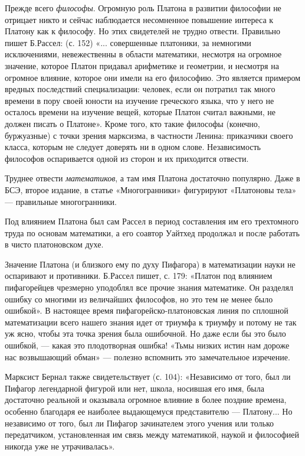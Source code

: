 Прежде  всего  \textit{философы}.  Огромную роль  Платона  в  развитии
философии  не   отрицает  никто   и  сейчас   наблюдается  несомненное
повышение  интереса  к Платону  как  к  философу. Но  этих  свидетелей
не   трудно  отвести.   Правильно  пишет   Б.Рассел:  (с.   152)  «...
совершенные  платоники,  за  немногими исключениями,  невежественны  в
области  математики, несмотря  на  огромное  значение, которое  Платон
придавал  арифметике  и геометрии,  и  несмотря  на огромное  влияние,
которое  они имели  на его  философию. Это  является примером  вредных
последствий специализации: человек, если он потратил так много времени
в  пору своей  юности  на изучение  греческого языка,  что  у него  не
осталось времени на изучение вещей,  которые Платон считал важными, не
должен писать  о Платоне».  Кроме того,  кто такие  философы (конечно,
буржуазные) с  точки зрения марксизма, в  частности Ленина: приказчики
своего  класса,  которым  не  следует   доверять  ни  в  одном  слове.
Независимость философов  оспаривается одной из сторон  и их приходится
отвести.

Труднее  отвести \textit{математиков},  а там  имя Платона  достаточно
популярно.  Даже  в  БСЭ,  второе издание,  в  статье  «Многогранники»
фигурируют «Платоновы тела» --- правильные многогранники.

Под  влиянием Платона  был  сам  Рассел в  период  составления им  его
трехтомного  труда  по  основам  математики,  а  его  соавтор  Уайтхед
продолжал и после работать в чисто платоновском духе.

Значение Платона  (и близкого  ему по  духу Пифагора)  в математизации
науки   не  оспаривают   и   противники.  Б.Рассел   пишет,  с.   179:
«Платон  под  влиянием  пифагорейцев чрезмерно  уподоблял  все  прочие
знания  математике.  Он  разделял  ошибку  со  многими  из  величайших
философов,  но это  тем  не  менее было  ошибкой».  В настоящее  время
пифагорейско-платоновская линия по сплошной математизации всего нашего
знания идет от  триумфа к триумфу и  потому не так уж  ясно, чтобы эта
точка зрения  была ошибочной. Но  даже если  бы это было  ошибкой, ---
какая  это плодотворная  ошибка!  «Тьмы низких  истин  нам дороже  нас
возвышающий обман» --- полезно вспомнить это замечательное изречение.

Марксист Бернал  также свидетельствует (с. 104):  «Независимо от того,
был ли Пифагор  легендарной фигурой или нет, школа,  носившая его имя,
была достаточно реальной и оказывала  огромное влияние в более поздние
времена,  особенно  благодаря  ее наиболее  выдающемуся  представителю
---  Платону... Но  независимо  от того,  был  ли Пифагор  зачинателем
этого  учения или  только передатчиком,  установленная им  связь между
математикой, наукой и философией никогда уже не утрачивалась».

